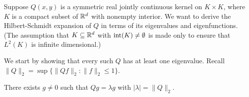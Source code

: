 
Suppose $Q(x,y)$ is a symmetric real jointly continuous kernel on $K \times K$, where $K$ is a compact subset of $\mathbb{R}^d$ with nonempty interior. We want to derive the Hilbert-Schmidt expansion of $Q$ in terms of its eigenvalues and eigenfunctions. (The assumption that $K \subseteq \mathbb{R}^d$ with $\operatorname{int}(K) \neq \emptyset$ is made only to ensure that $L^2(K)$ is infinite dimensional.)

We start by showing that every such $Q$ has at least one eigenvalue.
Recall $\|Q\|_2 = \sup\{\|Qf\|_2 : \|f\|_2 \leq 1\}$.

\begin{proposition}\label{prop:ch2_4.9}
There exists $g \neq 0$ such that $Qg = \lambda g$ with $|\lambda| = \|Q\|_2$.
\end{proposition}

